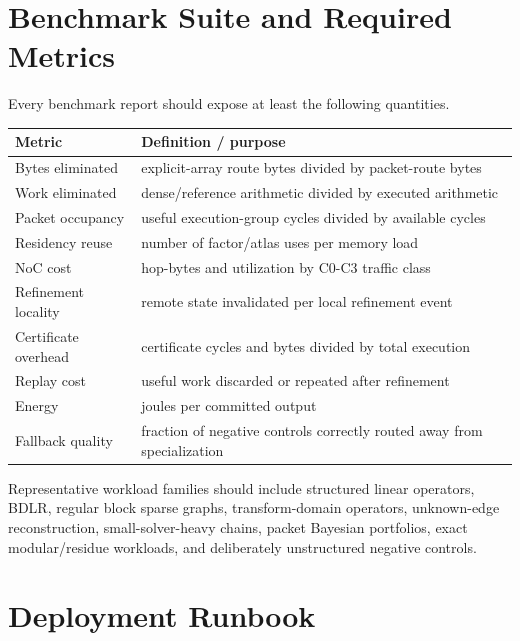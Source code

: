 \documentclass[10pt,letterpaper]{article}
\begin{document}
{{{%
\section{Benchmark Suite and Required Metrics}

Every benchmark report should expose at least the following quantities.

\begin{table}[h]
\centering
\begin{tabularx}{0.96\linewidth}{p{1.6in}X}
\toprule
\textbf{Metric} & \textbf{Definition / purpose}\\
\midrule
Bytes eliminated & explicit-array route bytes divided by packet-route bytes\\
Work eliminated & dense/reference arithmetic divided by executed arithmetic\\
Packet occupancy & useful execution-group cycles divided by available cycles\\
Residency reuse & number of factor/atlas uses per memory load\\
NoC cost & hop-bytes and utilization by C0-C3 traffic class\\
Refinement locality & remote state invalidated per local refinement event\\
Certificate overhead & certificate cycles and bytes divided by total execution\\
Replay cost & useful work discarded or repeated after refinement\\
Energy & joules per committed output\\
Fallback quality & fraction of negative controls correctly routed away from specialization\\
\bottomrule
\end{tabularx}
\end{table}

Representative workload families should include structured linear operators, BDLR, regular block sparse graphs, transform-domain operators, unknown-edge reconstruction, small-solver-heavy chains, packet Bayesian portfolios, exact modular/residue workloads, and deliberately unstructured negative controls.

\section{Deployment Runbook}

}}}
\end{document}

